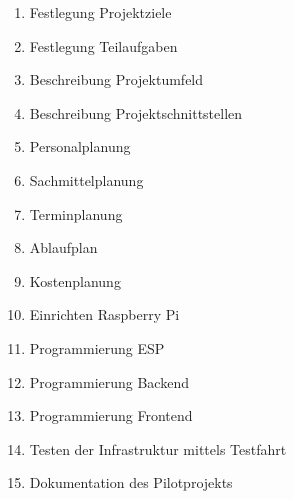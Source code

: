 \begin{enumerate}
	\item Festlegung Projektziele
	\item Festlegung Teilaufgaben
	\item Beschreibung Projektumfeld
	\item Beschreibung Projektschnittstellen
	\item Personalplanung
	\item Sachmittelplanung
	\item Terminplanung
	\item Ablaufplan
	\item Kostenplanung
	\item Einrichten Raspberry Pi
	\item Programmierung ESP
	\item Programmierung Backend
	\item Programmierung Frontend
	\item Testen der Infrastruktur mittels Testfahrt
	\item Dokumentation des Pilotprojekts
\end{enumerate}